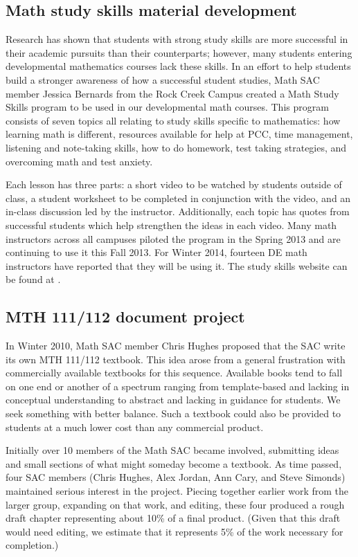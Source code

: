 \subsection{Math study skills material development}\label{cur:sub:studyskills}
Research has shown that students with strong study skills are more successful in their academic pursuits than their counterparts; however, many students entering developmental mathematics courses lack these skills.
In an effort to help students build a stronger awareness of how a successful student studies, Math SAC member Jessica Bernards from the Rock Creek Campus created a Math Study Skills program to be used in our developmental math courses.
This program consists of seven topics all relating to study skills specific to mathematics: how learning math is different, resources available for help at PCC, time management, listening and note-taking skills, how to do homework, test taking strategies, and overcoming math and test anxiety.

Each lesson has three parts: a short video to be watched by students outside of class, a student worksheet to be completed in conjunction with the video, and an in-class discussion led by the instructor.
Additionally, each topic has quotes from successful students which help strengthen the ideas in each video.
Many math instructors across all campuses piloted the program in the Spring 2013 and are continuing to use it this Fall 2013.
For Winter 2014, fourteen DE math instructors have reported that they will be using it.
The study skills website can be found at \cite{studyskills}.

\subsection{MTH 111/112 document project}\label{cur:sec:111/112doc}
In Winter 2010, Math SAC member Chris Hughes proposed that the SAC write its own MTH 111/112 textbook.
This idea arose from a general frustration with commercially available textbooks for this sequence.
Available books tend to fall on one end or another of a spectrum ranging from template-based and lacking in conceptual understanding to abstract and lacking in guidance for students.
We seek something with better balance.
Such a textbook could also be provided to students at a much lower cost than any commercial product.

Initially over 10 members of the Math SAC became involved, submitting ideas and small sections of what might someday become a textbook.
As time passed, four SAC members (Chris Hughes, Alex Jordan, Ann Cary, and Steve Simonds) maintained serious interest in the project.
Piecing together earlier work from the larger group, expanding on that work, and editing, these four produced a rough draft chapter representing about 10\% of a final product.
(Given that this draft would need editing, we estimate that it represents 5\% of the work necessary for completion.)

